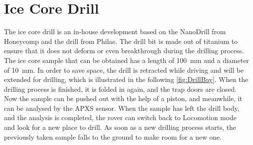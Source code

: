 \section{Ice Core Drill}
The ice core drill is an in-house development based on the NanoDrill from Honeycomp and the drill from Philae. The drill bit is made out of titanium to ensure that it does not deform or even breakthrough during the drilling process.
The ice core sample that can be obtained has a length of 100~mm and a diameter of 10~mm.
In order to save space, the drill is retracted while driving and will be extended for drilling, which is illustrated in the following \autoref{fig:DrillBay}.
When the drilling process is finished, it is folded in again, and the trap doors are closed.
Now the sample can be pushed out with the help of a piston, and meanwhile, it can be analysed by the APXS sensor. 
When the sample has left the drill body, and the analysis is completed, the rover can switch back to Locomotion mode and look for a new place to drill. As soon as a new drilling process starts, the previously taken sample falls to the ground to make room for a new one.

